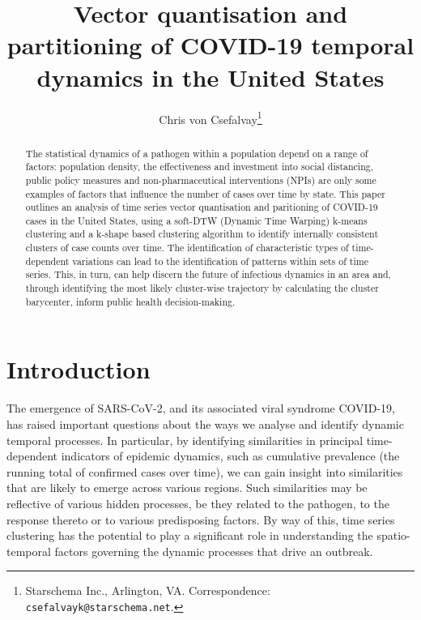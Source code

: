 \documentclass{article}
\title{Vector quantisation and partitioning of COVID-19 temporal dynamics in the United States}
\author{Chris von Csefalvay\thanks{Starschema Inc., Arlington, VA. Correspondence: \texttt{csefalvayk@starschema.net}.}}
\begin{document}
\maketitle

\begin{abstract}
    The statistical dynamics of a pathogen within a population depend on a range of factors: population density, the effectiveness and investment into social distancing, public policy measures and non-pharmaceutical interventions (NPIs) are only some examples of factors that influence the number of cases over time by state. This paper outlines an analysis of time series vector quantisation and paritioning of COVID-19 cases in the United States, using a soft-DTW (Dynamic Time Warping) k-means clustering and a k-shape based clustering algorithm to identify internally consistent clusters of case counts over time. The identification of characteristic types of time-dependent variations can lead to the identification of patterns within sets of time series. This, in turn, can help discern the future of infectious dynamics in an area and, through identifying the most likely cluster-wise trajectory by calculating the cluster barycenter, inform public health decision-making.
\end{abstract}


\section{Introduction} %
\label{sec:introduction}

The emergence of SARS-CoV-2, and its associated viral syndrome COVID-19, has raised important questions about the ways we analyse and identify dynamic temporal processes. In particular, by identifying similarities in principal time-dependent indicators of epidemic dynamics, such as cumulative prevalence (the running total of confirmed cases over time), we can gain insight into similarities that are likely to emerge across various regions. Such similarities may be reflective of various hidden processes, be they related to the pathogen, to the response thereto or to various predisposing factors. By way of this, time series clustering has the potential to play a significant role in understanding the spatio-temporal factors governing the dynamic processes that drive an outbreak.
\end{document}
